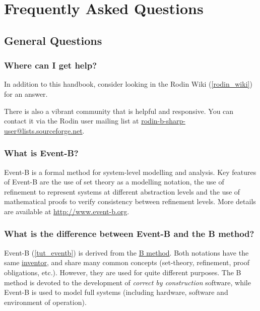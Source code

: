 \chapter{Frequently Asked Questions}
\label{faq}

\section{General Questions}

\subsection{Where can I get help?}
\label{faq_getting_help}

In addition to this handbook, consider looking in the Rodin Wiki (\ref{rodin_wiki}) for an answer.

There is also a vibrant community that is helpful and responsive.  You can contact it via the Rodin user mailing list at \href{mailto:rodin-b-sharp-user@lists.sourceforge.net}{rodin-b-sharp-user@lists.source\-forge\-.net}.

\subsection{What is Event-B?}

Event-B is a formal method for system-level modelling and analysis. Key features of Event-B are the use of set theory as a modelling notation, the use of refinement to represent systems at different abstraction levels and the use of mathematical proofs to verify consistency between refinement levels.
More details are available at \url{http://www.event-b.org}.

\subsection{What is the difference between Event-B and the B method?}

Event-B (\ref{tut_eventb}) is derived from the \href{https://en.wikipedia.org/wiki/B-Method}{B method}. Both notations have the same \href{https://en.wikipedia.org/wiki/Jean-Raymond_Abrial}{inventor}, and share many common concepts (set-theory, refinement, proof obligations, etc.). However, they are used for quite different purposes. The B method is devoted to the development of \textit{correct by construction} software, while Event-B is used to model full systems (including hardware, software and environment of operation).

